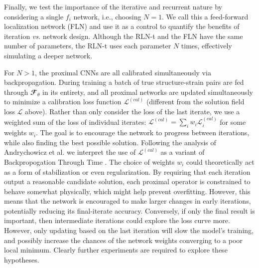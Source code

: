 \documentclass[3p, preprint]{elsarticle}
\newcommand{\Loss}{\mathscr{L}}
\newcommand{\Ftheta}{\mathbfcal{F}_\theta}
\newenvironment{revision} {} {}
\begin{document}
Finally, we test the importance of the iterative and recurrent nature by considering a single $f_i$ network, i.e., choosing $N=1$. We call this a feed-forward localization network (FLN) and use it as a control to quantify the benefits of iteration \textit{vs.} network design. Although the RLN-t and the FLN have the same number of parameters, the RLN-t uses each parameter $N$ times, effectively simulating a deeper network. 

For $N > 1$, the proximal CNNs are all calibrated simultaneously via backpropagation. During training a batch of true structure-strain pairs are fed through $\Ftheta$ in its entirety, and all proximal networks are updated simultaneously to minimize a \begin{revision}
calibration\end{revision} loss function $\Loss^{(cal)}$ (different from the solution field loss $\Loss$ above). Rather than only consider the loss of the last iterate, we use a weighted sum of the loss of individual iterates: $\Loss^{(cal)} = \sum_i w_i \Loss^{(cal)}_i$ for some weights $w_i$. The goal is to encourage the network to progress between iterations, while also finding the best possible solution. \begin{revision} Following the analysis of Andrychowicz et al. \cite{andrychowicz2016learning} we interpret the use of $\Loss^{(cal)}$ as a variant of Backpropogation Through Time \cite{Mozer1989_backprop_time}. The choice of weights $w_i$ could theoretically act as a form of stabilization or even regularization. By requiring that each iteration output a reasonable candidate solution, each proximal operator is constrained to behave somewhat physically, which might help prevent overfitting. However, this means that the network is encouraged to make larger changes in early iterations, potentially reducing its final-iterate accuracy. Conversely, if only the final result is important, then intermediate iterations could explore the loss curve more. However, only updating based on the last iteration will slow the model's training, and possibly increase the chances of the network weights converging to a poor local minimum. Clearly further experiments are required to explore these hypotheses.\end{revision}
\end{document}
